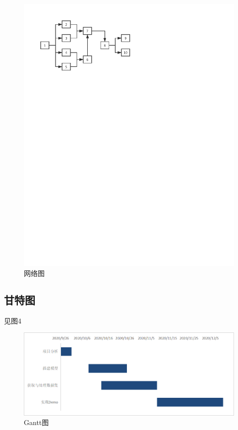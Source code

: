 \documentclass[
  hyperref, a4paper]{ctexart}
\begin{document}
\begin{figure}
\centering
\includegraphics{network.pdf}
\caption{网络图}
\end{figure}

\hypertarget{ux7518ux7279ux56fe}{%
\subsection{甘特图}\label{ux7518ux7279ux56fe}}

见图4

\begin{figure}
\centering
\includegraphics{3.png}
\caption{Gantt图}
\end{figure}
\end{document}
